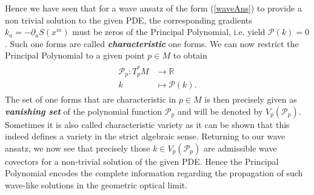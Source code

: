 \documentclass[a4paper,12pt, DIV=14, BCOR=5mm, twoside, headsepline, numbers=noenddot]{scrbook}
\begin{document}
Hence we have seen that for a wave ansatz of the form (\ref{waveAns}) to provide a non trivial solution to the given PDE, the corresponding gradients $k_a = - \partial_aS(x^m)$ must be zeros of the Principal Polynomial, i.e. yield $\mathcal{P}(k) = 0$.
Such one forms are called \textit{\textbf{characteristic}} one forms. We can now restrict the Principal Polynomial to a given point $p \in M$ to obtain 
\begin{align}
    \begin{aligned}
    \mathcal{P}_p : T^{\ast}_pM &\longrightarrow \mathbb{R}\\
    k &\longmapsto \mathcal{P}(k).
    \end{aligned}
\end{align}
The set of one forms that are characteristic in $p \in M$ is then precisely given as \textbf{\textit{vanishing set}} of the polynomial function $\mathcal{P}_p$ and will be denoted by $V_p(\mathcal{P}_p)$. Sometimes it is also called characteristic variety as it can be shown that this indeed defines a variety in the strict algebraic sense. Returning to our wave ansatz, we now see that precisely those $k \in V_p(\mathcal{P}_p)$ are admissible wave covectors for a non-trivial solution of the given PDE. Hence the Principal Polynomial encodes the complete information regarding the propagation of such wave-like solutions in the geometric optical limit.
\end{document}

